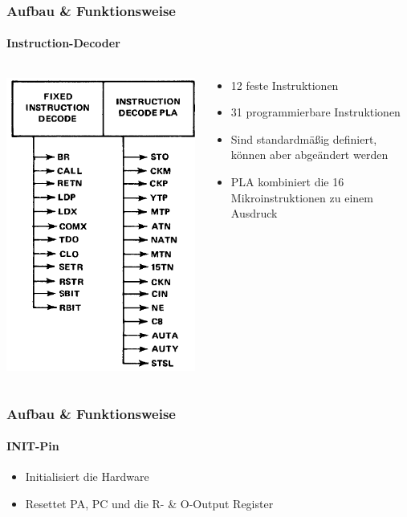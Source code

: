\begin{frame}
\frametitle{Aufbau \& Funktionsweise}
	\framesubtitle{Instruction-Decoder}
		\begin{columns}
			\begin{column}{5cm}
				\includegraphics[scale=0.3]{images/IDEC.PNG}
			\end{column}
			\begin{column}{5cm}
				\begin{itemize}
					\item 12 feste Instruktionen \pause
					\item 31 programmierbare Instruktionen \pause
					\item Sind standardm{\"a}{\ss}ig definiert, k{\"o}nnen aber abge{\"a}ndert werden \pause
					\item PLA kombiniert die 16 Mikroinstruktionen zu einem Ausdruck
				\end{itemize}
			\end{column}
		\end{columns}
\end{frame}


\begin{frame}
\frametitle{Aufbau \& Funktionsweise}
	\framesubtitle{INIT-Pin}
		\begin{itemize}
			\item Initialisiert die Hardware \pause
			\item Resettet PA, PC und die R- \& O-Output Register
		\end{itemize}
\end{frame}


